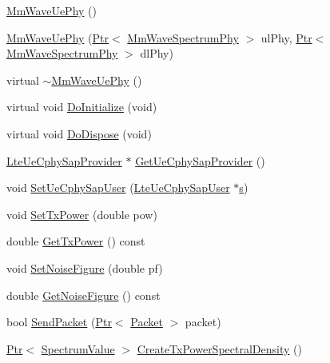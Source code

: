 \begin{DoxyCompactItemize}
\item 
\hyperlink{classns3_1_1MmWaveUePhy_a63deda164fb6d38efc5d44c83371b0a5}{Mm\+Wave\+Ue\+Phy} ()
\item 
\hyperlink{classns3_1_1MmWaveUePhy_a9abf97c4bdca3b2a12d5230563a97de6}{Mm\+Wave\+Ue\+Phy} (\hyperlink{classns3_1_1Ptr}{Ptr}$<$ \hyperlink{classns3_1_1MmWaveSpectrumPhy}{Mm\+Wave\+Spectrum\+Phy} $>$ ul\+Phy, \hyperlink{classns3_1_1Ptr}{Ptr}$<$ \hyperlink{classns3_1_1MmWaveSpectrumPhy}{Mm\+Wave\+Spectrum\+Phy} $>$ dl\+Phy)
\item 
virtual \hyperlink{classns3_1_1MmWaveUePhy_a69f75855b6a9c2c3b0e3fea00fcdcf39}{$\sim$\+Mm\+Wave\+Ue\+Phy} ()
\item 
virtual void \hyperlink{classns3_1_1MmWaveUePhy_a61561bfea34df07e006f2bf3916689f6}{Do\+Initialize} (void)
\item 
virtual void \hyperlink{classns3_1_1MmWaveUePhy_ae9a23d7c898e41bdfa479c7a7c055df2}{Do\+Dispose} (void)
\item 
\hyperlink{classns3_1_1LteUeCphySapProvider}{Lte\+Ue\+Cphy\+Sap\+Provider} $\ast$ \hyperlink{classns3_1_1MmWaveUePhy_afd2c0f46f83ccd0d66cccc57f98dfa55}{Get\+Ue\+Cphy\+Sap\+Provider} ()
\item 
void \hyperlink{classns3_1_1MmWaveUePhy_aa6a477838bfb55822cf600df6fa108f6}{Set\+Ue\+Cphy\+Sap\+User} (\hyperlink{classns3_1_1LteUeCphySapUser}{Lte\+Ue\+Cphy\+Sap\+User} $\ast$\hyperlink{generate__test__data__lte__sinr_8m_ad83eeb3a142285d1243a08c6b7026df8}{s})
\item 
void \hyperlink{classns3_1_1MmWaveUePhy_ab3d07076a051efbb2516d784c937e5d7}{Set\+Tx\+Power} (double pow)
\item 
double \hyperlink{classns3_1_1MmWaveUePhy_a1824b34d73f79ea9037c604190ac6e99}{Get\+Tx\+Power} () const 
\item 
void \hyperlink{classns3_1_1MmWaveUePhy_a97f7a50f8555ad2a9f776c45c40c69e7}{Set\+Noise\+Figure} (double pf)
\item 
double \hyperlink{classns3_1_1MmWaveUePhy_a0d6f6208e0a36ee64b33e2380e5f6c99}{Get\+Noise\+Figure} () const 
\item 
bool \hyperlink{classns3_1_1MmWaveUePhy_af9977ccfa1bfe29a8501d0d2c7c532e4}{Send\+Packet} (\hyperlink{classns3_1_1Ptr}{Ptr}$<$ \hyperlink{classns3_1_1Packet}{Packet} $>$ packet)
\item 
\hyperlink{classns3_1_1Ptr}{Ptr}$<$ \hyperlink{classns3_1_1SpectrumValue}{Spectrum\+Value} $>$ \hyperlink{classns3_1_1MmWaveUePhy_afd60953d36d736bfe06b98a829d6bcf6}{Create\+Tx\+Power\+Spectral\+Density} ()

\end{DoxyCompactItemize}
